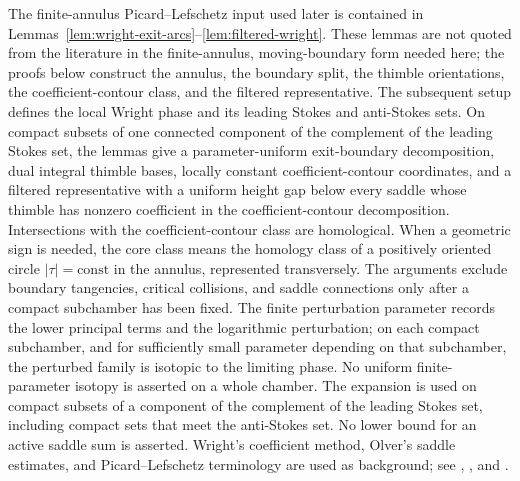 \documentclass[reqno]{article}
\theoremstyle{definition}
\theoremstyle{remark}
\theoremstyle{plain}
\begin{document}
The finite-annulus Picard--Lefschetz input used later is contained in Lemmas~\ref{lem:wright-exit-arcs}--\ref{lem:filtered-wright}. These lemmas are not quoted from the literature in the finite-annulus, moving-boundary form needed here; the proofs below construct the annulus, the boundary split, the thimble orientations, the coefficient-contour class, and the filtered representative. The subsequent setup defines the local Wright phase and its leading Stokes and anti-Stokes sets. On compact subsets of one connected component of the complement of the leading Stokes set, the lemmas give a parameter-uniform exit-boundary decomposition, dual integral thimble bases, locally constant coefficient-contour coordinates, and a filtered representative with a uniform height gap below every saddle whose thimble has nonzero coefficient in the coefficient-contour decomposition. Intersections with the coefficient-contour class are homological. When a geometric sign is needed, the core class means the homology class of a positively oriented circle $|\tau|=\text{const}$ in the annulus, represented transversely. The arguments exclude boundary tangencies, critical collisions, and saddle connections only after a compact subchamber has been fixed. The finite perturbation parameter records the lower principal terms and the logarithmic perturbation; on each compact subchamber, and for sufficiently small parameter depending on that subchamber, the perturbed family is isotopic to the limiting phase. No uniform finite-parameter isotopy is asserted on a whole chamber. The expansion is used on compact subsets of a component of the complement of the leading Stokes set, including compact sets that meet the anti-Stokes set. No lower bound for an active saddle sum is asserted. Wright's coefficient method, Olver's saddle estimates, and Picard--Lefschetz terminology are used as background; see \cite{W1,W2}, \cite[Chs.~4 and~9]{Olver}, and \cite{Pham}.
\end{document}

